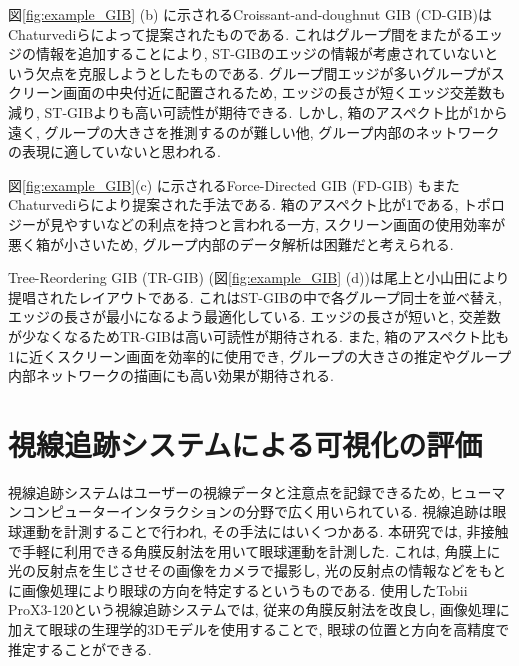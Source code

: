 \documentclass{kuee}
\begin{document}
図\ref{fig:example_GIB} (b) に示されるCroissant-and-doughnut GIB (CD-GIB)はChaturvediら\cite{chaturvedi2014group}によって提案されたものである.
これはグループ間をまたがるエッジの情報を追加することにより, ST-GIBのエッジの情報が考慮されていないという欠点を克服しようとしたものである.
グループ間エッジが多いグループがスクリーン画面の中央付近に配置されるため, エッジの長さが短くエッジ交差数も減り, ST-GIBよりも高い可読性が期待できる.
しかし, 箱のアスペクト比が1から遠く, グループの大きさを推測するのが難しい他, グループ内部のネットワークの表現に適していないと思われる.

図\ref{fig:example_GIB}(c) に示されるForce-Directed GIB (FD-GIB) もまたChaturvediら\cite{chaturvedi2014group}により提案された手法である.
箱のアスペクト比が1である, トポロジーが見やすいなどの利点を持つと言われる一方, スクリーン画面の使用効率が悪く箱が小さいため, グループ内部のデータ解析は困難だと考えられる.

Tree-Reordering GIB (TR-GIB) (図\ref{fig:example_GIB} (d))は尾上と小山田\cite{onoue2017optimal}により提唱されたレイアウトである.
これはST-GIBの中で各グループ同士を並べ替え, エッジの長さが最小になるよう最適化している.
エッジの長さが短いと, 交差数が少なくなるためTR-GIBは高い可読性が期待される.
また, 箱のアスペクト比も1に近くスクリーン画面を効率的に使用でき, グループの大きさの推定やグループ内部ネットワークの描画にも高い効果が期待される.


\section{視線追跡システムによる可視化の評価}
\label{sec:evaluation_with_eyetracking}
視線追跡システムはユーザーの視線データと注意点を記録できるため, ヒューマンコンピューターインタラクションの分野で広く用いられている\cite{andrienko2012visual,duchowski2007eye,kurzhals2014evaluating}.
視線追跡は眼球運動を計測することで行われ, その手法にはいくつかある.
本研究では, 非接触で手軽に利用できる角膜反射法を用いて眼球運動を計測した.
これは, 角膜上に光の反射点を生じさせその画像をカメラで撮影し, 光の反射点の情報などをもとに画像処理により眼球の方向を特定するというものである.
使用したTobii ProX3-120という視線追跡システムでは, 従来の角膜反射法を改良し, 画像処理に加えて眼球の生理学的3Dモデルを使用することで, 眼球の位置と方向を高精度で推定することができる.
\end{document}
